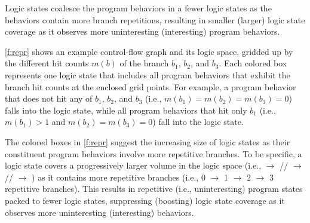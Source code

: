 \documentclass[letterpaper,twocolumn,10pt]{article}
\begin{document}
Logic states coalesce the program behaviors in a fewer logic states as the
behaviors contain more branch repetitions, resulting in smaller (larger)
logic state coverage as it observes more uninteresting (interesting) program
behaviors.


\autoref{f:repr} shows an example control-flow graph and its logic space,
gridded up by the different hit counts $m(b)$ of the branch $b_1$, $b_2$, and $b_3$.
Each colored box represents one logic state that includes all program
behaviors that exhibit the branch hit counts at the enclosed grid points.
For example, a program behavior that does not hit any of $b_1$, $b_2$, and $b_3$ 
(i.e., $m(b_1)=m(b_2)=m(b_3)=0$) falls into the  logic state, while
all program behaviors that hit only $b_1$ (i.e., $m(b_1)>1$ and
$m(b_2)=m(b_3)=0$) fall into the  logic state.

The colored boxes in \autoref{f:repr} suggest the increasing size of logic
states as their constituent program behaviors involve more repetitive branches.
To be specific, a logic state covers a progressively larger volume in the logic
space (i.e.,  $\rightarrow$ //
$\rightarrow$ // $\rightarrow$
) as it contains more repetitive branches (i.e., 0 $\rightarrow$ 1
$\rightarrow$ 2 $\rightarrow$ 3 repetitive branches). 
%
This results in repetitive (i.e., uninteresting) program states packed
to fewer logic states, suppressing (boosting) logic state coverage as it observes more
uninteresting (interesting) behaviors.

\end{document}
